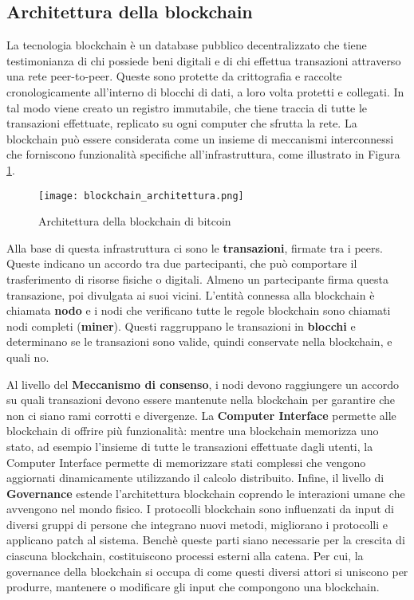 \subsection{Architettura della blockchain}
La tecnologia blockchain è un database pubblico decentralizzato che tiene testimonianza di chi possiede beni digitali e di chi effettua transazioni attraverso una rete peer-to-peer. Queste sono protette da crittografia e raccolte cronologicamente all'interno di blocchi di dati, a loro volta protetti e collegati. In tal modo viene creato un registro immutabile, che tiene traccia di tutte le transazioni effettuate, replicato su ogni computer che sfrutta la rete. La blockchain può essere considerata come un insieme di meccanismi interconnessi che forniscono funzionalità specifiche all'infrastruttura, come illustrato in Figura \ref{fig:blockchain_architettura}.

\begin{figure}[htbp]
  \centering
  \texttt{[image: blockchain\_architettura.png]}
  \caption{Architettura della blockchain di bitcoin}
  \label{fig:blockchain_architettura}
\end{figure}

Alla base di questa infrastruttura ci sono le \textbf{transazioni}, firmate tra i peers. Queste indicano un accordo tra due partecipanti, che può comportare il trasferimento di risorse fisiche o digitali. Almeno un partecipante firma questa transazione, poi divulgata ai suoi vicini. L'entità connessa alla blockchain è chiamata \textbf{nodo} e i nodi che verificano tutte le regole blockchain sono chiamati nodi completi (\textbf{miner}). Questi raggruppano le transazioni in \textbf{blocchi} e determinano se le transazioni sono valide, quindi conservate nella blockchain, e quali no.

Al livello del \textbf{Meccanismo di consenso}, i nodi devono raggiungere un accordo su quali transazioni devono essere mantenute nella blockchain per garantire che non ci siano rami corrotti e divergenze.
La \textbf{Computer Interface} permette alle blockchain di offrire più funzionalità: mentre una blockchain memorizza uno stato, ad esempio l'insieme di tutte le transazioni effettuate dagli utenti, la Computer Interface permette di memorizzare stati complessi che vengono aggiornati dinamicamente utilizzando il calcolo distribuito.
Infine, il livello di \textbf{Governance} estende l'architettura blockchain coprendo le interazioni umane che avvengono nel mondo fisico. I protocolli blockchain sono influenzati da input di diversi gruppi di persone che integrano nuovi metodi, migliorano i protocolli e applicano patch al sistema. Benchè queste parti siano necessarie per la crescita di ciascuna blockchain, costituiscono processi esterni alla catena. Per cui, la governance della blockchain si occupa di come questi diversi attori si uniscono per produrre, mantenere o modificare gli input che compongono una blockchain.

